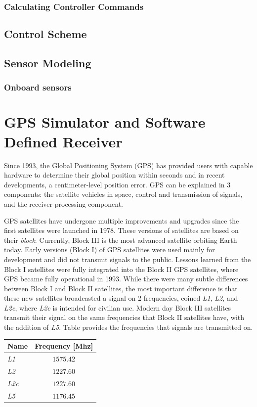 \documentclass[12pt]{report}
\begin{document}
\subsection{Calculating Controller Commands}


\section{Control Scheme}

\section{Sensor Modeling}
\subsection{Onboard sensors}

\chapter{GPS Simulator and Software Defined Receiver}
Since 1993, the Global Positioning System (GPS) has provided users with capable hardware to determine their global position within seconds and in recent developments, a centimeter-level position error. GPS can be explained in 3 components: the satellite vehicles in space, control and transmission of signals, and the receiver processing component.

GPS satellites have undergone multiple improvements and upgrades since the first satellites were launched in 1978. These versions of satellites are based on their \textit{block}. Currently, Block III is the most advanced satellite orbiting Earth today. Early versions (Block I) of GPS satellites were used mainly for development and did not transmit signals to the public. Lessons learned from the Block I satellites were fully integrated into the Block II GPS satellites, where GPS became fully operational in 1993. While there were many subtle differences between Block I and Block II satellites, the most important difference is that these new satellites broadcasted a signal on 2 frequencies, coined \textit{L1}, \textit{L2}, and \textit{L2c}, where \textit{L2c} is intended for civilian use. Modern day Block III satellites transmit their signal on the same frequencies that Block II satellites have, with the addition of \textit{L5}. Table provides the frequencies that signals are transmitted on.

\begin{table}[h!]\label{tbl:GPSfreq}
  \centering
  \begin{tabular}{lc}
    \toprule
    \textbf{Name} & \textbf{Frequency [Mhz]} \\
    \midrule
    \textit{L1}   & \(1575.42\)              \\
    \textit{L2}   & \(1227.60\)              \\
    \textit{L2c}  & \(1227.60\)              \\
    \textit{L5}   & \(1176.45\)              \\
    \bottomrule
  \end{tabular}
\end{table}
\end{document}
